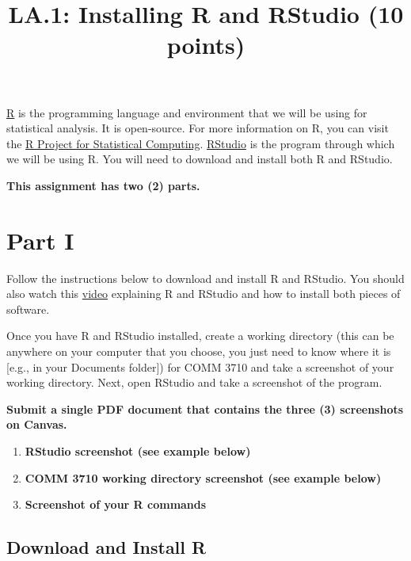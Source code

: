 \documentclass[
]{article}
\title{LA.1: Installing R and RStudio (10 points)}
\author{}
\date{\vspace{-2.5em}}
\providecommand{\tightlist}{%
  \setlength{\itemsep}{0pt}\setlength{\parskip}{0pt}}
\begin{document}
\maketitle

{
\hypersetup{linkcolor=}
\setcounter{tocdepth}{2}
\tableofcontents
}
\href{https://cran.r-project.org/}{R} is the programming language and
environment that we will be using for statistical analysis. It is
open-source. For more information on R, you can visit the
\href{https://www.r-project.org/}{R Project for Statistical Computing}.
\href{https://rstudio.com/}{RStudio} is the program through which we
will be using R. You will need to download and install both R and
RStudio.

\textbf{This assignment has two (2) parts.}

\hypertarget{part-i}{%
\section{Part I}\label{part-i}}

Follow the instructions below to download and install R and RStudio. You
should also watch this \href{https://youtu.be/ZvPFKfNHBNQ}{video}
explaining R and RStudio and how to install both pieces of software.

Once you have R and RStudio installed, create a working directory (this
can be anywhere on your computer that you choose, you just need to know
where it is {[}e.g., in your Documents folder{]}) for COMM 3710 and take
a screenshot of your working directory. Next, open RStudio and take a
screenshot of the program.

\textbf{Submit a single PDF document that contains the three (3)
screenshots on Canvas.}

\begin{enumerate}
\def\labelenumi{\arabic{enumi}.}
\tightlist
\item
  \textbf{RStudio screenshot (see example below)}
\item
  \textbf{COMM 3710 working directory screenshot (see example below)}
\item
  \textbf{Screenshot of your R commands}
\end{enumerate}

\hypertarget{download-and-install-r}{%
\subsection{Download and Install R}\label{download-and-install-r}}
\end{document}
